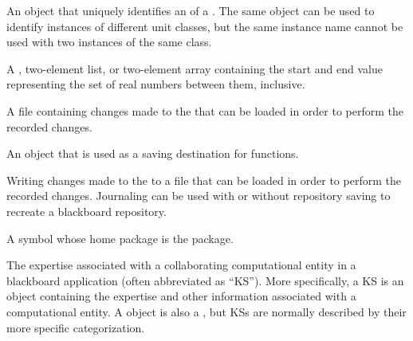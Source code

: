 \begin{glossary-list}
%
%
%
%
An object that uniquely identifies an  of a
.  The same object can be used to identify instances of
different unit classes, but the same instance name cannot be used with two
instances of the same class.


\glent[interval] 
%
%
%
A , two-element list, or two-element array containing the start
and end value representing the set of real numbers between them, inclusive.


\glent[journal] 
%
%
A file containing changes made to the  that can
be loaded in order to perform the recorded changes.


%
%
%
%
An object that is used as a saving destination for
 functions.


\glent[journaling] 
%
%
Writing changes made to the  to a file that can
be loaded in order to perform the recorded changes.  Journaling can be used
with or without repository saving to recreate a blackboard repository.


%
%
%
%
%
A symbol whose home package is the  package.


%
%
%
%
%
The expertise associated with a collaborating computational entity in
a blackboard application (often abbreviated as ``KS''). More
specifically, a KS is an object containing the expertise and other
information associated with a computational entity. A  object
is also a , but KSs are normally described
by their more specific categorization.


\end{glossary-list}
